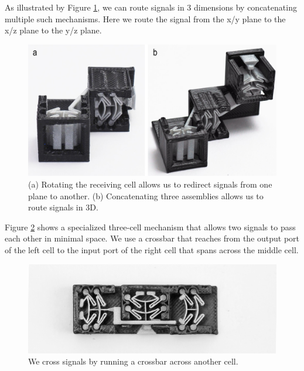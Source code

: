 As illustrated by Figure \ref{fig:9-siganl-redirecting-90deg-3D}, we can route signals in 3 dimensions by concatenating multiple such mechanisms. Here we route the signal from the x/y plane to the x/z plane to the y/z plane. 

\begin{figure} [h]  
    \includegraphics[width=\textwidth]{chapters/digital-metamaterials-FIG/9-siganl-redirecting-90deg-3D.pdf}
    \caption[Short figure name.]{(a) Rotating the receiving cell allows us to redirect signals from one plane to another. (b) Concatenating three assemblies allows us to route signals in 3D. 
    \label{fig:9-siganl-redirecting-90deg-3D}}
\end{figure}

Figure \ref{fig:10-signal-crossing} shows a specialized three-cell mechanism that allows two signals to pass each other in minimal space. We use a crossbar that reaches from the output port of the left cell to the input port of the right cell that spans across the middle cell.

\begin{figure} [h]  
    \includegraphics[width=\textwidth]{chapters/digital-metamaterials-FIG/10-signal-crossing.jpg}
    \caption[Short figure name.]{We cross signals by running a crossbar across another cell.
    \label{fig:10-signal-crossing}}
\end{figure}

